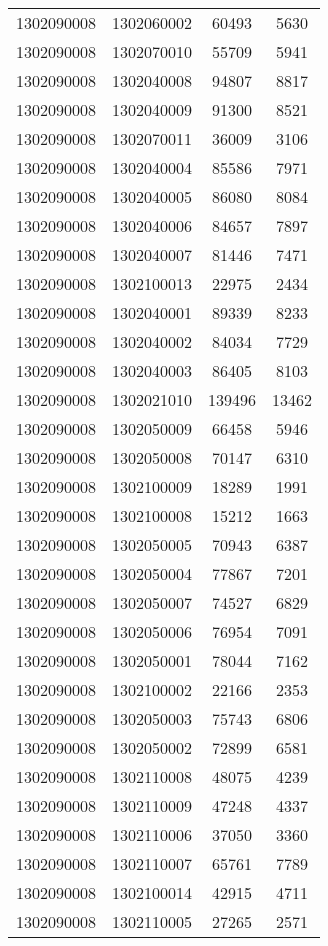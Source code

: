\begin{longtable}[h]{llcc}
		1302090008 & 1302060002 & 60493 & 5630\\
		1302090008 & 1302070010 & 55709 & 5941\\
		1302090008 & 1302040008 & 94807 & 8817\\
		1302090008 & 1302040009 & 91300 & 8521\\
		1302090008 & 1302070011 & 36009 & 3106\\
		1302090008 & 1302040004 & 85586 & 7971\\
		1302090008 & 1302040005 & 86080 & 8084\\
		1302090008 & 1302040006 & 84657 & 7897\\
		1302090008 & 1302040007 & 81446 & 7471\\
		1302090008 & 1302100013 & 22975 & 2434\\
		1302090008 & 1302040001 & 89339 & 8233\\
		1302090008 & 1302040002 & 84034 & 7729\\
		1302090008 & 1302040003 & 86405 & 8103\\
		1302090008 & 1302021010 & 139496 & 13462\\
		1302090008 & 1302050009 & 66458 & 5946\\
		1302090008 & 1302050008 & 70147 & 6310\\
		1302090008 & 1302100009 & 18289 & 1991\\
		1302090008 & 1302100008 & 15212 & 1663\\
		1302090008 & 1302050005 & 70943 & 6387\\
		1302090008 & 1302050004 & 77867 & 7201\\
		1302090008 & 1302050007 & 74527 & 6829\\
		1302090008 & 1302050006 & 76954 & 7091\\
		1302090008 & 1302050001 & 78044 & 7162\\
		1302090008 & 1302100002 & 22166 & 2353\\
		1302090008 & 1302050003 & 75743 & 6806\\
		1302090008 & 1302050002 & 72899 & 6581\\
		1302090008 & 1302110008 & 48075 & 4239\\
		1302090008 & 1302110009 & 47248 & 4337\\
		1302090008 & 1302110006 & 37050 & 3360\\
		1302090008 & 1302110007 & 65761 & 7789\\
		1302090008 & 1302100014 & 42915 & 4711\\
		1302090008 & 1302110005 & 27265 & 2571\\

\end{longtable}
